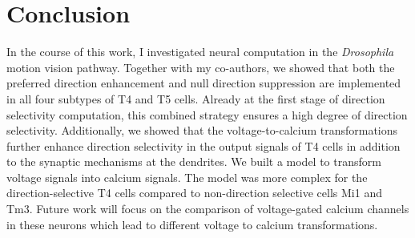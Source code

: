 \section{Conclusion}
In the course of this work, I investigated neural computation in the \textit{Drosophila} motion vision pathway. Together with my co-authors, we showed that both the preferred direction enhancement and null direction suppression are implemented in all four subtypes of T4 and T5 cells. Already at the first stage of direction selectivity computation, this combined strategy ensures a high degree of direction selectivity. Additionally, we showed that the voltage-to-calcium transformations further enhance direction selectivity in the output signals of T4 cells in addition to the synaptic mechanisms at the dendrites. We built a model to transform voltage signals into calcium signals. The model was more complex for the direction-selective T4 cells compared to non-direction selective cells Mi1 and Tm3. Future work will focus on the comparison of voltage-gated calcium channels in these neurons which lead to different voltage to calcium transformations.



